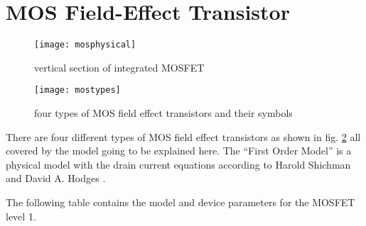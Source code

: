 \section{MOS Field-Effect Transistor}

\begin{figure}[ht]
\begin{center}
\texttt{[image: mosphysical]}
\end{center}
\caption{vertical section of integrated MOSFET}
\label{fig:MOSphysical}
\end{figure}
\FloatBarrier

\begin{figure}[ht]
\begin{center}
\texttt{[image: mostypes]}
\end{center}
\caption{four types of MOS field effect transistors and their symbols}
\label{fig:MOStypes}
\end{figure}
\FloatBarrier

There are four different types of MOS field effect transistors as
shown in fig. \ref{fig:MOStypes} all covered by the model going to be
explained here.  The ``First Order Model'' is a physical model with
the drain current equations according to Harold Shichman and David
A. Hodges \cite{Shichman}.

\addvspace{12pt}

The following table contains the model and device parameters for the
MOSFET level 1.

